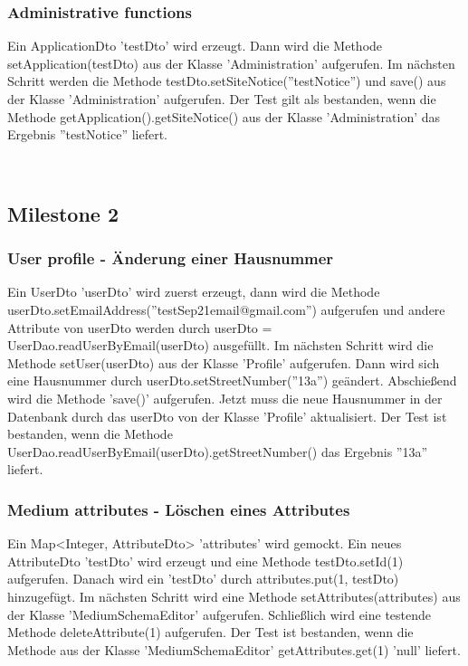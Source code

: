 \documentclass{article}
\begin{document}
\subsubsection{Administrative functions}
Ein ApplicationDto 'testDto' wird erzeugt. Dann wird die Methode setApplication(testDto) aus der Klasse 'Administration' aufgerufen. Im nächsten Schritt werden die Methode \linebreak testDto.setSiteNotice(''testNotice'') und save() aus der Klasse 'Administration' aufgerufen. Der Test gilt als bestanden, wenn die Methode getApplication().getSiteNotice() aus der Klasse 'Administration' das Ergebnis ''testNotice'' liefert.

­\subsection{Milestone 2}
\subsubsection{User profile - Änderung einer Hausnummer}
Ein UserDto 'userDto' wird zuerst erzeugt, dann wird die Methode \linebreak userDto.setEmailAddress(''testSep21email@gmail.com'') aufgerufen und andere Attribute von userDto werden durch userDto = UserDao.readUserByEmail(userDto) ausgefüllt. Im nächsten Schritt wird die Methode setUser(userDto) aus der Klasse 'Profile' aufgerufen. Dann wird sich eine Hausnummer durch userDto.setStreetNumber(''13a'') geändert. Abschießend wird die Methode 'save()' aufgerufen. Jetzt muss die neue Hausnummer in der Datenbank durch das userDto von der Klasse 'Profile' aktualisiert. Der Test ist bestanden, wenn die Methode \linebreak UserDao.readUserByEmail(userDto).getStreetNumber() das Ergebnis ''13a'' liefert.

\subsubsection{Medium attributes - Löschen eines Attributes}
Ein Map<Integer, AttributeDto> 'attributes' wird gemockt. Ein neues AttributeDto 'testDto' wird erzeugt und eine Methode testDto.setId(1) aufgerufen. Danach wird ein 'testDto' durch attributes.put(1, testDto) hinzugefügt. Im nächsten Schritt wird eine Methode setAttributes(attributes) aus der Klasse 'MediumSchemaEditor' aufgerufen. Schließlich wird eine testende Methode deleteAttribute(1) aufgerufen. Der Test ist bestanden, wenn die Methode aus der Klasse 'MediumSchemaEditor' getAttributes.get(1) 'null' liefert.
\end{document}
